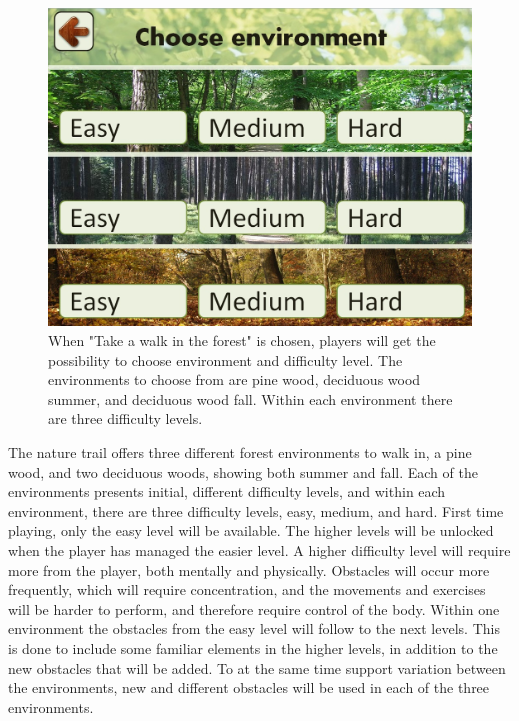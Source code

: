 \begin{figure} [H]
\centering
\includegraphics[scale=0.45]{chooseEnvironment.jpg}
\caption[Choice of environment and difficulty level]{When "Take a walk in the forest" is chosen, players will get the possibility to choose environment and difficulty level. The environments to choose from are pine wood, deciduous wood summer, and deciduous wood fall. Within each environment there are three difficulty levels.}
\label{fig:omgivelseNivaa}
\end{figure}

The nature trail offers three different forest environments to walk in, a pine wood, and two deciduous woods, showing both summer and fall. Each of the environments presents initial, different difficulty levels, and within each environment, there are three difficulty levels, easy, medium, and hard. First time playing, only the easy level will be available. The higher levels will be unlocked when the player has managed the easier level. A higher difficulty level will require more from the player, both mentally and physically. Obstacles will occur more frequently, which will require concentration, and the movements and exercises will be harder to perform, and therefore require control of the body. Within one environment the obstacles from the easy level will follow to the next levels. This is done to include some familiar elements in the higher levels, in addition to the new obstacles that will be added. To at the same time support variation between the environments, new and different obstacles will be used in each of the three environments.  

